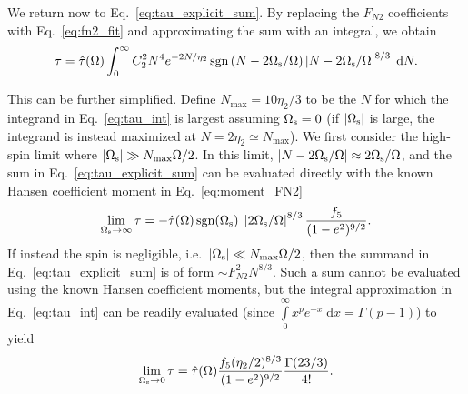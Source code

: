 \documentclass[
        fleqn,
        usenatbib,
    ]{mnras}
\newcommand*{\abs}[1]{\left|#1\right|}
\DeclareMathOperator*{\sgn}{sgn}
\begin{document}
We return now to Eq.~\eqref{eq:tau_explicit_sum}. By replacing the $F_{N2}$
coefficients with Eq.~\eqref{eq:fn2_fit} and approximating the sum with an
integral, we obtain
\begin{equation}
    \tau = \hat{\tau}(\Omega) \int_0^\infty C_2^2 N^4 e^{-2N / \eta_2}
        \sgn\left(N - 2\Omega_{\rm s} / \Omega\right) \left|N - 2 \Omega_{\rm s} /
            \Omega\right|^{8/3}\;\mathrm{d}N.\label{eq:tau_int}
\end{equation}

This can be further simplified. Define $N_{\max} = 10\eta_2/3$ to be the $N$ for
which the integrand in Eq.~\eqref{eq:tau_int} is largest assuming $\Omega_{\rm
s} = 0$ (if $\abs{\Omega_{\rm s}}$ is large, the integrand is instead maximized
at $N = 2\eta_2 \simeq N_{\max}$). We first consider the high-spin limit where
$\abs{\Omega_{\rm s}} \gg N_{\max}\Omega / 2$. In this limit, $\abs{N -
2\Omega_{\rm s} / \Omega} \approx 2\Omega_{\rm s} / \Omega$, and the sum in
Eq.~\eqref{eq:tau_explicit_sum} can be evaluated directly with the known Hansen
coefficient moment in Eq.~\eqref{eq:moment_FN2}
\begin{equation}
    \lim_{\Omega_{\rm s} \to \infty} \tau = -\hat{\tau}(\Omega) \sgn
        (\Omega_{\rm s})\;\left|2 \Omega_{\rm s} / \Omega\right|^{8/3}
        \frac{f_5}{(1 - e^2)^{9/2}}.\label{eq:tau_highspin}
\end{equation}
If instead the spin is negligible, i.e.\ $\abs{\Omega_{\rm s}} \ll
N_{\max}\Omega / 2$, then the summand in Eq.~\eqref{eq:tau_explicit_sum} is of
form $\sim F_{N2}^2 N^{8/3}$. Such a sum cannot be evaluated using the known
Hansen coefficient moments, but the integral approximation in
Eq.~\eqref{eq:tau_int} can be readily evaluated (since $\int\limits_0^\infty
x^pe^{-x}\;\mathrm{d}x = \Gamma(p - 1)$) to yield
\begin{equation}
    \lim_{\Omega_{\rm s} \to 0} \tau = \hat{\tau}(\Omega)
        \frac{f_5 (\eta_2/2)^{8/3}}{(1 - e^2)^{9/2}} \frac{\Gamma(23/3)}{4!}.
        \label{eq:tau_lowspin}
\end{equation}
\end{document}
